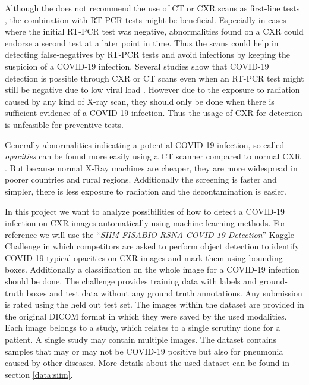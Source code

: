 Although the \citeauthor{acr2020recommendation} does not recommend the use of \ac{CT} or \ac{CXR} scans as first-line tests \autocite{acr2020recommendation}, the combination with \ac{RT-PCR} tests might be beneficial. Especially in cases where the initial \ac{RT-PCR} test was negative, abnormalities found on a \acs{CXR} could endorse a second test at a later point in time. Thus the scans could help in detecting false-negatives by \ac{RT-PCR} tests and avoid infections by keeping the suspicion of a COVID-19 infection. Several studies show that COVID-19 detection is possible through \ac{CXR} or \ac{CT} scans even when an \ac{RT-PCR} test might still be negative due to low viral load \autocite{wang2020combination, tahamtan2020real}. However due to the exposure to radiation caused by any kind of X-ray scan, they should only be done when there is sufficient evidence of a COVID-19 infection. Thus the usage of \ac{CXR} for detection is unfeasible for preventive tests.

Generally abnormalities indicating a potential COVID-19 infection, so called \textit{opacities} can be found more easily using a CT scanner compared to normal \ac{CXR} \autocite{jacobi2020portable}. But because normal X-Ray machines are cheaper, they are more widespread in poorer countries and rural regions. Additionally the screening is faster and simpler, there is less exposure to radiation and the decontamination is easier.

In this project we want to analyze possibilities of how to detect a COVID-19 infection on \ac{CXR} images automatically using machine learning methods. For reference we will use the \enquote{\textit{SIIM-FISABIO-RSNA COVID-19 Detection}} Kaggle Challenge \autocite{SIIMKaggle} in which competitors are asked to perform object detection to identify COVID-19 typical opacities on \ac{CXR} images and mark them using bounding boxes. Additionally a classification on the whole image for a COVID-19 infection should be done.
The challenge provides training data with labels and ground-truth boxes and test data without any ground truth annotations. Any submission is rated using the held out test set. The images within the dataset are provided in the original DICOM format in which they were saved by the used modalities. Each image belongs to a study, which relates to a single scrutiny done for a patient. A single study may contain multiple images. The dataset contains samples that may or may not be COVID-19 positive but also for pneumonia caused by other diseases. More details about the used dataset can be found in section \vref{data:siim}.

